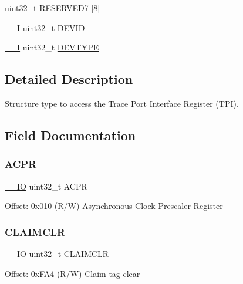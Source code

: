 \begin{DoxyCompactItemize}
\item 
uint32\+\_\+t \mbox{\hyperlink{struct_t_p_i___type_a7055d97dce64c27cd79d6672bd41db21}{R\+E\+S\+E\+R\+V\+E\+D7}} \mbox{[}8\mbox{]}
\item 
\mbox{\hyperlink{core__sc300_8h_af63697ed9952cc71e1225efe205f6cd3}{\+\_\+\+\_\+I}} uint32\+\_\+t \mbox{\hyperlink{struct_t_p_i___type_ac427ef592ac98a4e2d4b04d76ce02a4e}{D\+E\+V\+ID}}
\item 
\mbox{\hyperlink{core__sc300_8h_af63697ed9952cc71e1225efe205f6cd3}{\+\_\+\+\_\+I}} uint32\+\_\+t \mbox{\hyperlink{struct_t_p_i___type_a67888dcdd12f305556012ba4c39cea19}{D\+E\+V\+T\+Y\+PE}}
\end{DoxyCompactItemize}


\subsection{Detailed Description}
Structure type to access the Trace Port Interface Register (T\+PI). 

\subsection{Field Documentation}
\mbox{\label{struct_t_p_i___type_a4bdbe4ff58983d940ca72d8733feaedd}} 
\subsubsection{\texorpdfstring{ACPR}{ACPR}}
{\footnotesize\ttfamily \mbox{\hyperlink{core__sc300_8h_aec43007d9998a0a0e01faede4133d6be}{\+\_\+\+\_\+\+IO}} uint32\+\_\+t A\+C\+PR}

Offset\+: 0x010 (R/W) Asynchronous Clock Prescaler Register \mbox{\label{struct_t_p_i___type_a9c887c45efeb6fef9b6a9ab5bc490f62}} 
\subsubsection{\texorpdfstring{CLAIMCLR}{CLAIMCLR}}
{\footnotesize\ttfamily \mbox{\hyperlink{core__sc300_8h_aec43007d9998a0a0e01faede4133d6be}{\+\_\+\+\_\+\+IO}} uint32\+\_\+t C\+L\+A\+I\+M\+C\+LR}

Offset\+: 0x\+F\+A4 (R/W) Claim tag clear \mbox{\label{struct_t_p_i___type_a72a4fb10cf406fa6af1740e3bf6c2e41}} 
